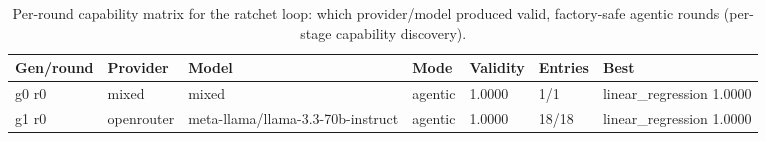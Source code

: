 \begin{table}[H]
\centering\small
\caption{Per-round capability matrix for the ratchet loop: which provider/model produced valid, factory-safe agentic rounds (per-stage capability discovery).}
\label{tab:ratchet-rounds-ratchet-ledger-e-commerce}
\begin{tabular}{lllllll}
\toprule
Gen/round & Provider & Model & Mode & Validity & Entries & Best \\
\midrule
g0 r0 & mixed & mixed & agentic & 1.0000 & 1/1 & linear\_regression 1.0000 \\
g1 r0 & openrouter & meta-llama/llama-3.3-70b-instruct & agentic & 1.0000 & 18/18 & linear\_regression 1.0000 \\
\bottomrule
\end{tabular}
\end{table}
